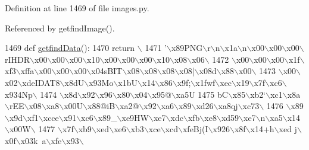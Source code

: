 Definition at line 1469 of file images.\+py.



Referenced by getfind\+Image().


\begin{DoxyCode}
1469 \textcolor{keyword}{def }\hyperlink{namespaceimages_a6a60138ccf8d2891b14779cc5e54c1bd}{getfindData}():
1470     \textcolor{keywordflow}{return} \(\backslash\)
1471 \textcolor{stringliteral}{'\(\backslash\)x89PNG\(\backslash\)r\(\backslash\)n\(\backslash\)x1a\(\backslash\)n\(\backslash\)x00\(\backslash\)x00\(\backslash\)x00\(\backslash\)rIHDR\(\backslash\)x00\(\backslash\)x00\(\backslash\)x00\(\backslash\)x10\(\backslash\)x00\(\backslash\)x00\(\backslash\)x00\(\backslash\)x10\(\backslash\)x08\(\backslash\)x06\(\backslash\)}
1472 \textcolor{stringliteral}{\(\backslash\)x00\(\backslash\)x00\(\backslash\)x00\(\backslash\)x1f\(\backslash\)xf3\(\backslash\)xffa\(\backslash\)x00\(\backslash\)x00\(\backslash\)x00\(\backslash\)x04sBIT\(\backslash\)x08\(\backslash\)x08\(\backslash\)x08\(\backslash\)x08|\(\backslash\)x08d\(\backslash\)x88\(\backslash\)x00\(\backslash\)}
1473 \textcolor{stringliteral}{\(\backslash\)x00\(\backslash\)x02\(\backslash\)xdeIDAT8\(\backslash\)x8dU\(\backslash\)x93Mo\(\backslash\)x1bU\(\backslash\)x14\(\backslash\)x86\(\backslash\)x9f;\(\backslash\)x1fwf\(\backslash\)xec\(\backslash\)x19\(\backslash\)x7f\(\backslash\)xc6\(\backslash\)x934Np\(\backslash\)}
1474 \textcolor{stringliteral}{\(\backslash\)x8d\(\backslash\)x92\(\backslash\)x96\(\backslash\)x80\(\backslash\)x04\(\backslash\)x95@\(\backslash\)xa5U%
1475 \textcolor{stringliteral}{bC\(\backslash\)x85\(\backslash\)xb2`\(\backslash\)xc1\(\backslash\)x8a\(\backslash\)rEE\(\backslash\)x08\(\backslash\)xa8\(\backslash\)x00U\(\backslash\)x88@iB\(\backslash\)xa2@\(\backslash\)x92\(\backslash\)xa6\(\backslash\)x89\(\backslash\)xd26\(\backslash\)xa8qj\(\backslash\)xc73\(\backslash\)}
1476 \textcolor{stringliteral}{\(\backslash\)x89\(\backslash\)x9d\(\backslash\)xf1\(\backslash\)xcce\(\backslash\)x91\(\backslash\)xc6\(\backslash\)x89\_\(\backslash\)xe9HW\(\backslash\)xe7\(\backslash\)xdc\(\backslash\)xfb\(\backslash\)xe8\(\backslash\)xd59\(\backslash\)xe7\(\backslash\)n\(\backslash\)xa5\(\backslash\)x14\(\backslash\)x00W\(\backslash\)}
1477 \textcolor{stringliteral}{\(\backslash\)x7f\(\backslash\)xb9\(\backslash\)xed\(\backslash\)xe6\(\backslash\)xb3\(\backslash\)xce\(\backslash\)xcd\(\backslash\)xfeBj(I\(\backslash\)x926\(\backslash\)x8f\(\backslash\)x14+h\(\backslash\)xed j\(\backslash\)x0f\(\backslash\)x03k~a\(\backslash\)xfe\(\backslash\)x93\(\backslash\)}
}
\end{DoxyCode}

